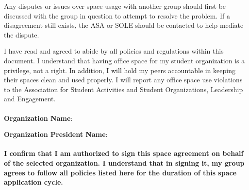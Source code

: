 \documentclass[12pt]{constitution}
\begin{document}
Any disputes or issues over space usage with another group should first be discussed with the
    group in question to attempt to resolve the problem.
If a disagreement still exists, the ASA or SOLE should be contacted to help mediate the dispute. 

I have read and agreed to abide by all policies and regulations within this document.
I understand that having office space for my student organization is a privilege, not a right.
In addition, I will hold my peers accountable in keeping their spaces clean and used properly.
I will report any office space use violations to the Association for Student Activities and
    Student Organizations, Leadership and Engagement.
\\
\\

\textbf{Organization Name}: \hrulefill

\textbf{Organization President Name}: \hrulefill
\\
\\
\textbf{
    I confirm that I am authorized to sign this space agreement on behalf of the selected organization.
    I understand that in signing it, my group agrees to follow all policies listed here for the duration
        of this space application cycle.
}
\end{document}

